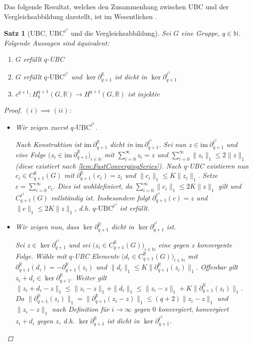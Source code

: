 \documentclass[a4paper,twoside,10pt]{scrreprt}
\newcommand {\img}{\text{im}~}
\newcommand{\N}{\mathbb{N}}
\newcommand{\R}{\mathbb{R}}
\newtheorem{satz}{Satz}[section]
\theoremstyle{definition}
\begin{document}
Das folgende Resultat, welches den Zusammenhang zwischen UBC und der Vergleichsabbildung darstellt, ist im Wesentlichen \cite[Theorem 2.8]{matsumoto}.
\begin{satz}[UBC, $\text{UBC}^{\ell^1}$ und die Vergleichsabbildung]\label{satz:UBCandComparisonMap}
Sei $G$ eine Gruppe, $q\in \N$. Folgende Aussagen sind äquivalent:
\renewcommand{\labelenumi}{(\roman{enumi}) }
\begin{enumerate}
\item $G$ erfüllt $q$-UBC
\item $G$ erfüllt $q$-$\text{UBC}^{\ell^1}$ und $\ker \partial_{q+1}^{\R}$ ist dicht in $\ker \partial_{q+1}^{\ell^1}$
\item $c^{q+1}:H_b^{q+1}(G,\R)\to H^{q+1}(G,\R)$ ist injektiv
\end{enumerate}
\begin{proof}
$(i)\implies(ii)$:
\begin{itemize}
\item Wir zeigen zuerst $q$-$\text{UBC}^{\ell^1}$.\par
Nach Konstruktion ist $\img \partial_{q+1}^{\R}$ dicht in $\img \partial_{q+1}^{\ell^1}$. Sei nun $z\in \img \partial_{q+1}^{\ell^1}$ und eine Folge $\bigl(z_i\in \img \partial_{q+1}^{\R}\bigr)_{i\in \N}$ mit $\sum\limits_{i=0}^{\infty}z_i=z$ und $\sum\limits_{i=0}^{\infty}\|z_i\|_1\leq 2\|z\|_1$ (diese existiert nach \cref{lem:FastConvergingSeries}). 
Nach $q$-UBC existieren nun $c_i\in C_{q+1}^{\R}(G)$ mit $\partial_{q+1}^{\R}(c_i)=z_i$ und $\|c_i\|_1\leq K\|z_i\|_1$. Setze $c=\sum\limits_{i=0}^{\infty}c_i$. Dies ist wohldefiniert, da $\sum\limits_{i=0}^{\infty}\|c_i\|_1\leq 2K\|z\|_1$ gilt und $C_{q+1}^{\ell^1}(G)$ vollständig ist. Insbesondere folgt $\partial_{q+1}^{\ell^1}(c)=z$ und $\|c\|_1\leq 2K\|z\|_1$, d.h. $q$-$\text{UBC}^{\ell^1}$ ist erfüllt.\par
\item Wir zeigen nun, dass $\ker \partial_{q+1}^{\R}$ dicht in $\ker \partial_{q+1}^{\ell^1}$ ist.\par
Sei $z\in \ker \partial_{q+1}^{\ell^1}$ und sei $\bigl(z_i\in C_{q+1}^{\R}(G)\bigr)_{i\in \N}$ eine gegen $z$ konvergente Folge. Wähle mit $q$-UBC Elemente $\bigl(d_i\in C_{q+1}^{\R}(G)\bigr)_{i\in \N}$ mit $\partial_{q+1}^{\R}(d_i)=-\partial_{q+1}^{\R}(z_i)$ und $\|d_i\|_1\leq K\|\partial_{q+1}^{\R}(z_i)\|_1$. Offenbar gilt $z_i+d_i\in \ker \partial_{q+1}^{\R}$. Weiter gilt $\|z_i+d_i-z\|_1\leq \|z_i-z\|_1+\|d_i\|_1\leq  \|z_i-z\|_1+K\|\partial_{q+1}^{\R}(z_i)\|_1$. Da $\|\partial_{q+1}^{\R}(z_i)\|_1=\|\partial_{q+1}^{\R}(z_i-z)\|_1\leq (q+2)\|z_i-z\|_1$ und $\|z_i-z\|_1$ nach Definition für $i\to \infty$ gegen $0$ konvergiert, konvergiert $z_i+d_i$ gegen $z$, d.h. $\ker \partial_{q+1}^{\R}$ ist dicht in $\ker \partial_{q+1}^{\ell^1}$.

\end{itemize}
\end{proof}
\end{satz}
\end{document}
